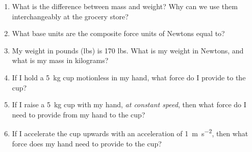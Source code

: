 \begin{enumerate}
\setlength\itemsep{1 in}

\item What is the difference between mass and weight? Why can we use them interchangeably at the grocery store?

\item What base units are the composite force units of Newtons equal to?

\item My weight in pounds (lbs) is 170 lbs. What is my weight in Newtons, and what is my mass in kilograms?



%




\item If I hold a \SI{5}{\kilogram} cup motionless in my hand, what force do I provide to the cup?\bigskip
\item If I raise a \SI{5}{\kilogram} cup with my hand, \emph{at constant speed}, then what force do I need to provide from my hand to the cup?\bigskip
\item If I accelerate the cup upwards with an acceleration of \SI{+1}{\meter \per \second^2}, then what force does my hand need to provide to the cup?\bigskip


\end{enumerate}
